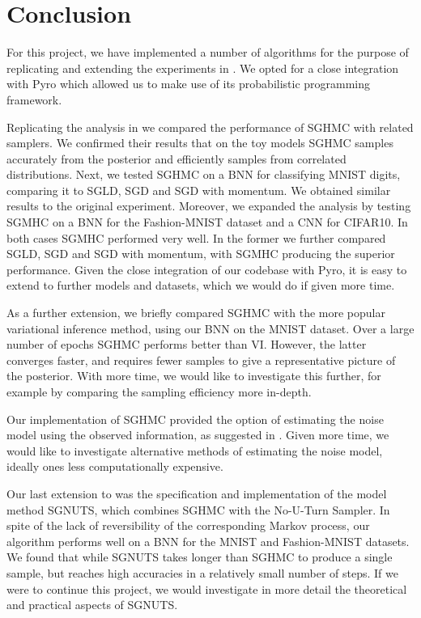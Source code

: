 
\section{Conclusion}

For this project, we have implemented a number of algorithms for the purpose of replicating and extending the experiments in \cite{sghmc}. We opted for a close integration with Pyro which allowed us to make use of its probabilistic programming framework. 

Replicating the analysis in \cite{sghmc} we compared the performance of SGHMC with related samplers. We confirmed their results that on the toy models SGHMC samples accurately from the posterior and efficiently samples from correlated distributions. Next, we tested SGHMC on a BNN for classifying MNIST digits, comparing it to SGLD, SGD and SGD with momentum. We obtained similar results to the original experiment. Moreover, we expanded the analysis by testing SGMHC on a BNN for the Fashion-MNIST dataset and a CNN for CIFAR10. In both cases SGMHC performed very well. In the former we further compared SGLD, SGD and SGD with momentum, with SGMHC producing the superior performance. Given the close integration of our codebase with Pyro, it is easy to extend to further models and datasets, which we would do if given more time.

As a further extension, we briefly compared SGHMC with the more popular variational inference method, using our BNN on the MNIST dataset. Over a large number of epochs SGHMC performs better than VI. However, the latter converges faster, and requires fewer samples to give a representative picture of the posterior. With more time, we would like to investigate this further, for example by comparing the sampling efficiency more in-depth.

Our implementation of SGHMC provided the option of estimating the noise model using the observed information, as suggested in \cite{sghmc}. Given more time, we would like to investigate alternative methods of estimating the noise model, ideally ones less computationally expensive.

Our last extension to \cite{sghmc} was the specification and implementation of the model method SGNUTS, which combines SGHMC with the No-U-Turn Sampler. In spite of the lack of reversibility of the corresponding Markov process, our algorithm performs well on a BNN for the MNIST and Fashion-MNIST datasets. We found that while SGNUTS takes longer than SGHMC to produce a single sample, but reaches high accuracies in a relatively small number of steps. If we were to continue this project, we would investigate in more detail the theoretical and practical aspects of SGNUTS.
